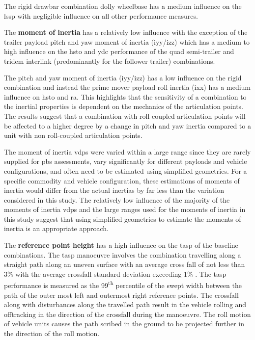 The rigid drawbar combination dolly wheelbase has a medium influence on the \gls{lssp} with negligible influence on all other performance measures.

The \textbf{moment of inertia} has a relatively low influence with the exception of the trailer payload pitch and yaw moment of inertia (\gls{iyy}/\gls{izz}) which has a medium to high influence on the \gls{hsto} and \gls{ydc} performance of the quad semi-trailer and tridem interlink (predominantly for the follower trailer) combinations. 

The pitch and yaw moment of inertia (\gls{iyy}/\gls{izz}) has a low influence on the rigid combination and instead the prime mover payload roll inertia (\gls{ixx}) has a medium influence on \gls{hsto} and \gls{ra}. This highlights that the sensitivity of a combination to the inertial properties is dependent on the mechanics of the articulation points. The results suggest that a combination with roll-coupled articulation points will be affected to a higher degree by a change in pitch and yaw inertia compared to a unit with non roll-coupled articulation points.

The moment of inertia \glspl{vdp} were varied within a large range since they are rarely supplied for \gls{pbs} assessments, vary significantly for different payloads and vehicle configurations, and often need to be estimated using simplified geometries. For a specific commodity and vehicle configuration, these estimations of moments of inertia would differ from the actual inertias by far less than the variation considered in this study. The relatively low influence of the majority of the moments of inertia \glspl{vdp} and the large ranges used for the moments of inertia in this study suggest that using simplified geometries to estimate the moments of inertia is an appropriate approach.

The \textbf{reference point height} has a high influence on the \gls{tasp} of the baseline combinations. The \gls{tasp} manoeuvre involves the combination travelling along a straight path along an uneven surface with an average cross fall of not less than 3\% with the average crossfall standard deviation exceeding 1\% \cite{NationalTransportCommission2008}. The \gls{tasp} performance is measured as the 99\textsuperscript{th} percentile of the swept width between the path of the outer most left and outermost right reference points. The crossfall along with disturbances along the travelled path result in the vehicle rolling and offtracking in the direction of the crossfall during the manoeuvre. The roll motion of vehicle units causes the path scribed in the ground to be projected further in the direction of the roll motion. 

